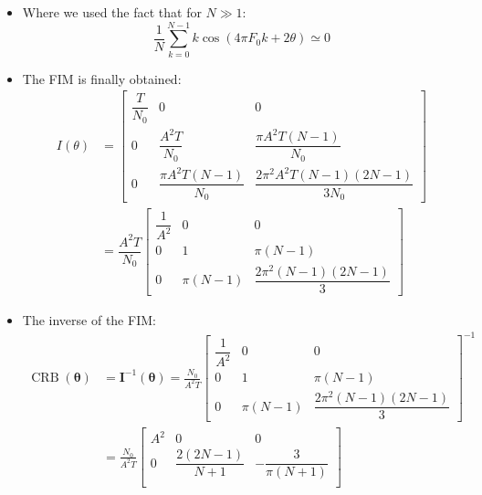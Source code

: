 \begin{itemize}
\begin{align*}
&= \frac{2\pi A^2}{N_0 B} \sum_{k=0}^{N-1}
   k \sin^{2}(2\pi F_0 k + \theta) \\
&= \frac{2\pi A^2}{2 N_0 B} \sum_{k=0}^{N-1}
   k \left[ 1 - \cos(4\pi F_0 k + 2\theta) \right] \\
&= \frac{\pi A^2}{N_0 B} \sum_{k=0}^{N-1} k
   - \frac{\pi A N}{N_0 B} \cdot \frac{1}{N}
     \sum_{k=0}^{N-1} k \cos(4\pi F_0 k + 2\theta) \\
&\cong \frac{\pi A^2}{N_0 B} \sum_{k=0}^{N-1} k
   = \frac{\pi A^2}{N_0 B} \cdot \frac{N(N-1)}{2}
   = \frac{\pi A^2 T (N-1)}{N_0}
\end{align*}
    \item Where we used the fact that for \(N\gg 1\):
    \[
    \frac{1}{N}\sum_{k=0}^{N-1}k\cos(4\pi F_0 k+2\theta)\simeq0
    \]

    \item The FIM is finally obtained:
    \begin{align*}
I(\theta)
&=
\begin{bmatrix}
\dfrac{T}{N_0} & 0 & 0 \\[8pt]
0 & \dfrac{A^{2}T}{N_0} & \dfrac{\pi A^{2}T (N-1)}{N_0} \\[8pt]
0 & \dfrac{\pi A^{2}T (N-1)}{N_0} &
   \dfrac{2\pi^{2}A^{2}T (N-1)(2N-1)}{3N_0}
\end{bmatrix} \\[8pt]
&=
\dfrac{A^{2}T}{N_0}
\begin{bmatrix}
\dfrac{1}{A^{2}} & 0 & 0 \\[8pt]
0 & 1 & \pi (N-1) \\[8pt]
0 & \pi (N-1) & \dfrac{2\pi^{2}(N-1)(2N-1)}{3}
\end{bmatrix}
\end{align*}
    \item The inverse of the FIM:     
    \begin{align*}
\operatorname{CRB}(\boldsymbol{\theta})
&= \boldsymbol{I}^{-1}(\boldsymbol{\theta})
   = \frac{N_0}{A^{2} T}
\begin{bmatrix}
\dfrac{1}{A^{2}} & 0 & 0 \\[4pt]
0 & 1 & \pi (N-1) \\[4pt]
0 & \pi (N-1) & \dfrac{2\pi^{2} (N-1)(2N-1)}{3}
\end{bmatrix}^{-1} \\[6pt]
&= \frac{N_0}{A^{2} T}
\begin{bmatrix}
A^{2} & 0 & 0 \\[4pt]
0 & \dfrac{2(2N-1)}{N+1} & -\dfrac{3}{\pi (N+1)} \\[4pt]

\end{bmatrix}
\end{align*}
\end{itemize}
